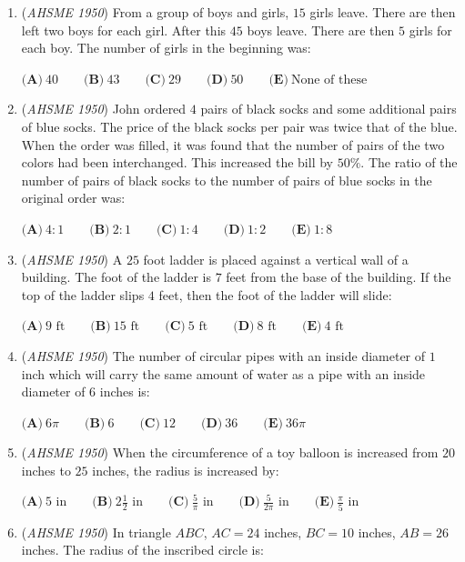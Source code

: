 \begin{enumerate}
	\item (\textit{AHSME 1950}) From a group of boys and girls, $15$ girls leave. There are then left two boys for each girl. After this $45$ boys leave. There are then $5$ girls for each boy. The number of girls in the beginning was:


 $\textbf{(A)}\ 40\qquad\textbf{(B)}\ 43\qquad\textbf{(C)}\ 29\qquad\textbf{(D)}\ 50\qquad\textbf{(E)}\ \text{None of these}$


	\item (\textit{AHSME 1950}) John ordered $4$ pairs of black socks and some additional pairs of blue socks. The price of the black socks per pair was twice that of the blue. When the order was filled, it was found that the number of pairs of the two colors had been interchanged. This increased the bill by $50\%$. The ratio of the number of pairs of black socks to the number of pairs of blue socks in the original order was:


 $\textbf{(A)}\ 4:1\qquad\textbf{(B)}\ 2:1\qquad\textbf{(C)}\ 1:4\qquad\textbf{(D)}\ 1:2\qquad\textbf{(E)}\ 1:8$


	\item (\textit{AHSME 1950}) A $25$ foot ladder is placed against a vertical wall of a building. The foot of the ladder is $7$ feet from the base of the building. If the top of the ladder slips $4$ feet, then the foot of the ladder will slide:


 $\textbf{(A)}\ 9\text{ ft}\qquad\textbf{(B)}\ 15\text{ ft}\qquad\textbf{(C)}\ 5\text{ ft}\qquad\textbf{(D)}\ 8\text{ ft}\qquad\textbf{(E)}\ 4\text{ ft}$


	\item (\textit{AHSME 1950}) The number of circular pipes with an inside diameter of $1$ inch which will carry the same amount of water as a pipe with an inside diameter of $6$ inches is:


 $\textbf{(A)}\ 6\pi\qquad\textbf{(B)}\ 6\qquad\textbf{(C)}\ 12\qquad\textbf{(D)}\ 36\qquad\textbf{(E)}\ 36\pi$


	\item (\textit{AHSME 1950}) When the circumference of a toy balloon is increased from $20$ inches to $25$ inches, the radius is increased by:


 $\textbf{(A)}\ 5\text{ in}\qquad\textbf{(B)}\ 2\frac{1}{2}\text{ in}\qquad\textbf{(C)}\ \frac{5}{\pi}\text{ in}\qquad\textbf{(D)}\ \frac{5}{2\pi}\text{ in}\qquad\textbf{(E)}\ \frac{\pi}{5}\text{ in}$


	\item (\textit{AHSME 1950}) In triangle $ABC$, $AC=24$ inches, $BC=10$ inches, $AB=26$ inches. The radius of the inscribed circle is:



\end{enumerate}
